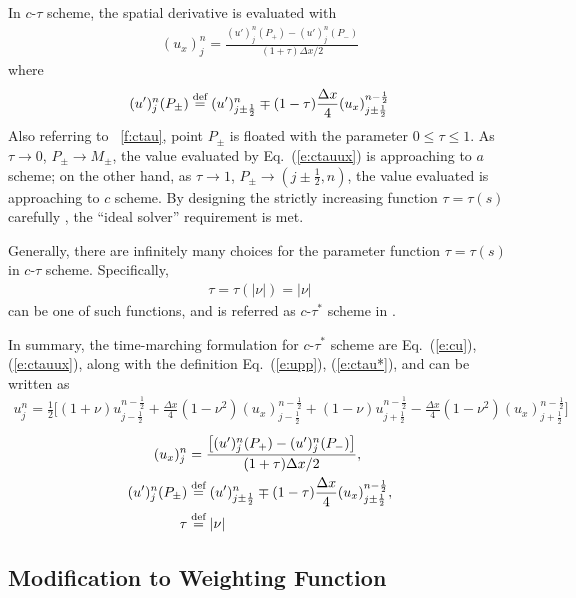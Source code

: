 \documentclass{turgon}
\begin{document}
In $c$-$\tau$ scheme, the spatial derivative is evaluated with
\begin{align}
  (u_x)_j^n = \frac{(u')_j^n(P_+) - (u')_j^n(P_-)}{(1+\tau)\Delta x/2}
  \label{e:ctauux}
\end{align}
where
\begin{align}
  (u')_j^n(P_{\pm}) \defeq
        (u')_{j\pm\frac{1}{2}}^n
    \mp (1-\tau)\frac{\Delta x}{4}(u_x)_{j\pm\frac{1}{2}}^{n-\frac{1}{2}}
  \label{e:upp}
\end{align}
Also referring to \figurename~\ref{f:ctau}, point $P_{\pm}$ is floated with the
parameter $0\le\tau\le1$.  As $\tau\rightarrow0$, $P_{\pm}\rightarrow M_{\pm}$,
the value evaluated by Eq.~(\ref{e:ctauux}) is approaching to $a$ scheme;
on the other hand, as $\tau\rightarrow1$,
$P_{\pm}\rightarrow(j\pm\frac{1}{2},n)$, the value evaluated is approaching to
$c$ scheme.  By designing the strictly increasing function $\tau = \tau(s)$
carefully \citep{chang_multi-dimensional_2003}, the ``ideal solver''
requirement is met.

Generally, there are infinitely many choices for the parameter function
$\tau=\tau(s)$ in $c$-$\tau$ scheme.  Specifically,
\begin{align}
  \tau = \tau(|\nu|) = |\nu| \label{e:ctau*}
\end{align}
can be one of such functions, and is referred as $c$-$\tau^*$ scheme in
\cite{chang_courant_2002, chang_multi-dimensional_2003}.

In summary, the time-marching formulation for $c$-$\tau^*$ scheme are
Eq.~(\ref{e:cu}), (\ref{e:ctauux}), along with the definition
Eq.~(\ref{e:upp}), (\ref{e:ctau*}), and can be written as
\begin{align*}
  u_j^n = \frac{1}{2}\Big[
      (1+\nu)u_{j-\frac{1}{2}}^{n-\frac{1}{2}}
    + \frac{\Delta x}{4}(1-\nu^2)(u_x)_{j-\frac{1}{2}}^{n-\frac{1}{2}}
    + (1-\nu)u_{j+\frac{1}{2}}^{n-\frac{1}{2}}
    - \frac{\Delta x}{4}(1-\nu^2)(u_x)_{j+\frac{1}{2}}^{n-\frac{1}{2}}
  \Big]
\end{align*}
\begin{align*}
  (u_x)_j^n &=
    \frac{\left[(u')_j^n(P_+) - (u')_j^n(P_-)\right]}
         {(1+\tau)\Delta x/2}, \\
  (u')_j^n(P_{\pm}) &\defeq
        (u')_{j\pm\frac{1}{2}}^n
    \mp (1-\tau)\frac{\Delta x}{4}
        (u_x)_{j\pm\frac{1}{2}}^{n-\frac{1}{2}}, \\
  \tau &\defeq |\nu|
\end{align*}

\subsection{Modification to Weighting Function}
\end{document}
